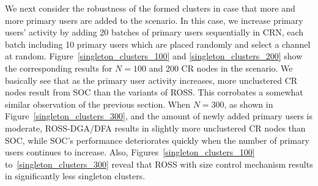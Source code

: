 \documentclass[times]{ettauth}
\theoremstyle{mytheoremstyle}
\theoremstyle{mytheoremstyle}
\theoremstyle{mytheoremstyle}
\begin{document}
We next consider the robustness of the formed clusters in case that more and more primary users are added to the scenario.
In this case, we increase primary users' activity by adding 20 batches of primary users sequentially in CRN, each batch including 10 primary users which are placed randomly and select a channel at random. 
Figure~\ref{singleton_clusters_100} and \ref{singleton_clusters_200} show the corresponding results for $N=100$ and 200 CR nodes in the scenario.
We basically see that as the primary user activity increases, more unclustered CR nodes result from SOC than the variants of ROSS.
This corrobates a somewhat similar observation of the previous section.
When $N=300$, as shown in Figure~\ref{singleton_clusters_300}, and the amount of newly added primary users is moderate, ROSS-DGA/DFA results in slightly more unclustered CR nodes than SOC, while SOC's performance deteriorates quickly when the number of primary users continues to increase.
Also, Figures~\ref{singleton_clusters_100} to~\ref{singleton_clusters_300} reveal that ROSS with size control mechanism results in significantly less singleton clusters.
\end{document}
